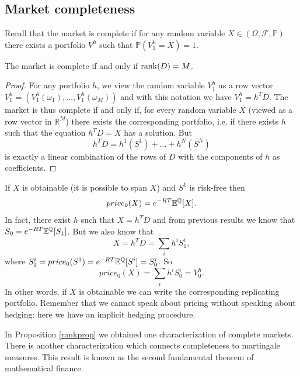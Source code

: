 \subsection{Market completeness}
Recall that the market is complete if for any random variable $X\in(\Omega,\mathcal{F},\mathbb{P})$ there exists a portfolio $V^h$ such that $\mathbb{P}(V_1^h=X)=1$.
\begin{proposition}\label{rankprop}
    The market is complete if and only if $\rank(D)=M$.
\end{proposition}
\begin{proof}
    For any portfolio $h$, we view the random variable $V^h_1$ as a row vector $V^h_1 =(V^h_1(\omega_1),\dots,V^h_1(\omega_M))$ and with this notation we have $V^h_1 = h^TD$. The market is thus complete if and only if, for every random variable $X$ (viewed as a row vector in $\mathbb{R}^M$) there exists the corresponding portfolio, i.e. if there exists $h$ such that the equation $h^TD = X$ has a solution. But
    \begin{equation*}
        h^TD = h^1(S^1)+\dots+h^N(S^N)
    \end{equation*}
    is exactly a linear combination of the rows of $D$ with the components of $h$ as coefficients.
\end{proof}
\begin{remark}
    If $X$ is obtainable (it is possible to span $X$) and $S^1$ is risk-free then
    \begin{equation*}
        price_0(X) = e^{-RT}\mathbb{E}^{\mathbb{Q}}[X].
    \end{equation*}
    In fact, there exist $h$ such that $X=h^TD$ and from previous results we know that $S_0 = e^{-RT}\mathbb{E}^{\mathbb{Q}}[S_1]$. But we also know that
    \begin{equation*}
        X=h^TD=\sum_ih^iS_1^i,
    \end{equation*}
    where $S_1^i=price_0(S^1)=e^{-RT}\mathbb{E}^{\mathbb{Q}}[S^i]=S^i_0$. So
    \begin{equation*}
        price_0(X) = \sum_ih^iS_0^i = V_0^h.
    \end{equation*}
    In other words, if $X$ is obtainable we can write the corresponding replicating portfolio. Remember that we cannot speak about pricing without speaking about hedging: here we have an implicit hedging procedure.
\end{remark}
In Proposition \ref{rankprop} we obtained one characterization of complete markets. There is another characterization which connects completeness to martingale measures. This result is known as the second fundamental theorem of mathematical finance.
